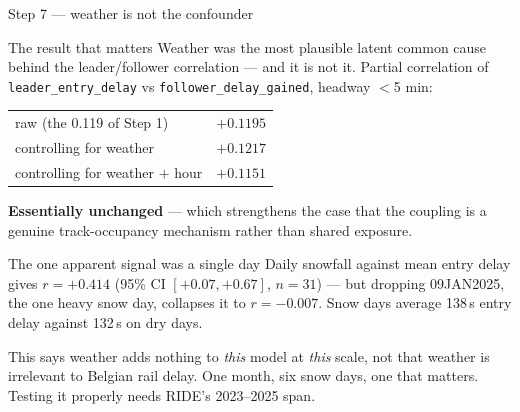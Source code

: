 \documentclass[aspectratio=169,10pt]{beamer}
\newcommand{\srcnote}[1]{{\scriptsize\color{ink3}#1}}
\newcommand{\hl}[1]{{\color{corange}\textbf{#1}}}
\begin{document}
\begin{frame}{Step 7 --- weather is not the confounder}
  \begin{block}{\small The result that matters}
    \small Weather was the most plausible latent common cause behind the leader/follower
    correlation --- and it is not it. Partial correlation of
    \texttt{leader\_entry\_delay} vs \texttt{follower\_delay\_gained}, headway $<$5 min:
    \vspace{0.3em}
    \begin{center}
    \begin{tabular}{@{}lr@{}}
      \toprule
      raw \srcnote{(the 0.119 of Step 1)} & $+0.1195$ \\
      controlling for weather & $+0.1217$ \\
      controlling for weather $+$ hour & $+0.1151$ \\
      \bottomrule
    \end{tabular}
    \end{center}
    \vspace{0.2em}
    \hl{Essentially unchanged} --- which strengthens the case that the coupling is a genuine
    track-occupancy mechanism rather than shared exposure.
  \end{block}

  \vspace{0.5em}
  \begin{alertblock}{\small The one apparent signal was a single day}
    \small Daily snowfall against mean entry delay gives $r = +0.414$
    (95\% CI $[+0.07, +0.67]$, $n=31$) --- but dropping 09JAN2025, the one heavy snow day,
    collapses it to $r = -0.007$. Snow days average 138\,s entry delay against 132\,s on
    dry days.
  \end{alertblock}

  \vspace{0.3em}
  \srcnote{This says weather adds nothing to \emph{this} model at \emph{this} scale, not that
  weather is irrelevant to Belgian rail delay. One month, six snow days, one that matters.
  Testing it properly needs RIDE's 2023--2025 span.}
\end{frame}
\end{document}
